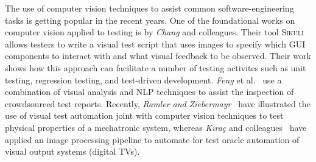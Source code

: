The use of computer vision techniques to assist common software-engineering tasks is getting popular in the recent years. One of the foundational works on computer vision applied to testing is by \textit{Chang} and colleagues. Their tool \textsc{Sikuli}~\cite{Sikuli} allows testers to write a visual test script that uses images to specify which GUI components to interact with and what visual feedback to be observed. Their work shows how this approach can facilitate a number of testing activites such as unit testing, regression testing, and test-driven development. \textit{Feng} et al.~\cite{Feng:2016:MTR:2970276.2970367} use a combination of visual analysis and NLP techniques to assist the inspection of crowdsourced test reports. 
Recently, \textit{Ramler and Ziebermayr}~\cite{2017-Ramler-ICSTW} have illustrated the use of visual test automation joint with computer vision techniques to test physical properties of a mechatronic system,  
whereas \textit{K{\i}ra\c{c}} and colleagues~\cite{KIRAC2018266} have applied an image processing pipeline to automate for test oracle automation of visual output systems (digital TVs). 
